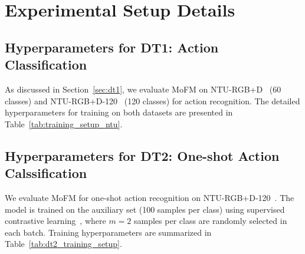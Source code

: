 \clearpage
\setcounter{page}{1}
\maketitlesupplementary
\section{Experimental Setup Details}
\subsection{Hyperparameters for DT1: Action Classification}
\label{appx:dt1}
As discussed in Section~\ref{sec:dt1}, we evaluate MoFM on NTU-RGB+D~\cite{ntu60Paper} (60 classes) and NTU-RGB+D-120~\cite{ntu120paper} (120 classes) for action recognition. The detailed hyperparameters for training on both datasets are presented in Table~\ref{tab:training_setup_ntu}.


\subsection{Hyperparameters for DT2: One-shot Action Calssification}
\label{appx:dt2}
We evaluate MoFM for one-shot action recognition on NTU-RGB+D-120~\cite{ntu120paper}. The model is trained on the auxiliary set (100 samples per class) using supervised contrastive learning~\cite{khosla2020supervised}, where \(m=2\) samples per class are randomly selected in each batch. Training hyperparameters are summarized in Table~\ref{tab:dt2_training_setup}.


